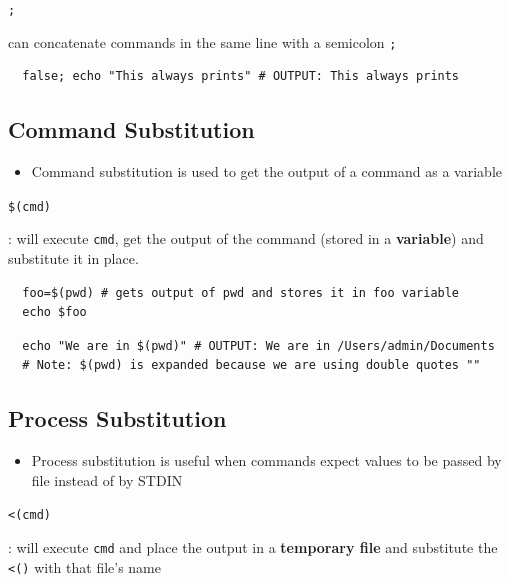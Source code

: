 \documentclass[letterpaper,12pt]{article}
\newcommand*{\lstitem}[1]{
  \setbox0\hbox{\lstinline{#1}}
  \item[\usebox0]
}
\begin{document}
\begin{description}
 \lstitem{;} can concatenate commands in the same line with a semicolon \lstinline{;}
\end{description}

\begin{lstlisting}
  false; echo "This always prints" # OUTPUT: This always prints
\end{lstlisting}

\subsection{Command Substitution}

\begin{itemize}
 \item Command substitution is used to get the output of a command as a variable
\end{itemize}

\begin{description}
 \lstitem{$(cmd)}: will execute \lstinline{cmd}, get the output of the command (stored in a \textbf{variable}) and substitute it in place.
\end{description}

\begin{lstlisting}
  foo=$(pwd) # gets output of pwd and stores it in foo variable
  echo $foo
\end{lstlisting}

\begin{lstlisting}
  echo "We are in $(pwd)" # OUTPUT: We are in /Users/admin/Documents
  # Note: $(pwd) is expanded because we are using double quotes ""
\end{lstlisting}

\subsection{Process Substitution}

\begin{itemize}
 \item Process substitution is useful when commands expect values to be passed by file instead of by STDIN
\end{itemize}

\begin{description}
 \lstitem{<(cmd)}: will execute \lstinline{cmd} and place the output in a \textbf{temporary file} and substitute the \lstinline{<()} with that file’s name
\end{description}
\end{document}
